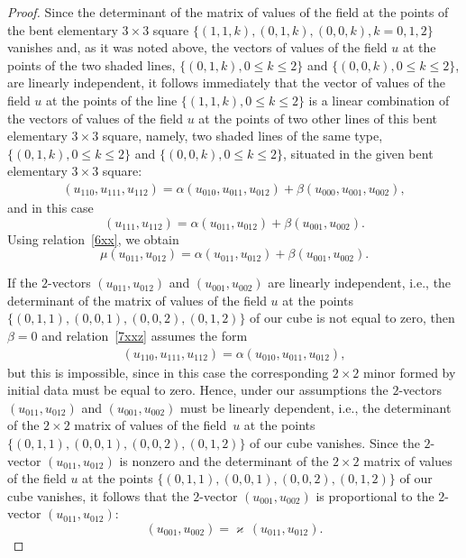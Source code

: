 \begin{proof}
Since the determinant of the matrix of values of the f\/ield at the
points of the bent elementary $3 \times 3$ square $\{(1, 1, k), (0,
1, k), (0, 0, k), k = 0, 1, 2\}$ vanishes and, as it was noted
above, the vectors of values of the f\/ield $u$ at the points of the
two shaded lines, $\{(0, 1, k), 0 \leq k \leq 2\}$ and $\{(0, 0, k),
0 \leq k \leq 2\}$, are linearly independent, it follows immediately
that the vector of values of the f\/ield $u$ at the points of the line
$\{(1, 1, k), 0 \leq k \leq 2\}$ is a linear combination of the
vectors of values of the f\/ield $u$ at the points of two other lines
of this bent elementary $3 \times 3$ square, namely, two shaded
lines of the same type, $\{(0, 1, k), 0 \leq k \leq 2\}$ and $\{(0,
0, k), 0 \leq k \leq 2\}$, situated in the given bent elementary $3
\times 3$ square:
\begin{gather} (u_{1 1 0}, u_{1 1 1}, u_{1 1 2}) = \alpha (u_{0 1 0}, u_{0 1
1}, u_{0 1 2}) + \beta (u_{0 0 0}, u_{0 0 1}, u_{0 0 2}),
\label{7xxz}
\end{gather} and in this case \[ (u_{1 1 1}, u_{1 1 2}) =
\alpha (u_{0 1 1}, u_{0 1 2}) + \beta (u_{0 0 1}, u_{0 0 2}). \]
Using relation~\eqref{6xx}, we obtain \[ \mu (u_{0 1 1}, u_{0 1 2})
= \alpha (u_{0 1 1}, u_{0 1 2}) + \beta (u_{0 0 1}, u_{0 0 2}). \]


If the $2$-vectors $(u_{0 1 1}, u_{0 1 2})$ and $(u_{0 0 1}, u_{0 0
2})$ are linearly independent, i.e., the determinant of the matrix
of values of the f\/ield $u$ at the points $\{(0, 1, 1), (0, 0, 1),
(0, 0, 2), (0, 1, 2)\}$ of our cube is not equal to zero, then
$\beta = 0$ and relation~\eqref{7xxz} assumes the form
\begin{gather*} (u_{1 1
0}, u_{1 1 1}, u_{1 1 2}) = \alpha (u_{0 1 0}, u_{0 1 1}, u_{0 1
2}), %
\end{gather*} but this is impossible, since in this case the
corresponding $2 \times 2$ minor formed by initial data must be
equal to zero.
Hence, under our assumptions the $2$-vectors $(u_{0 1 1}, u_{0 1
2})$ and $(u_{0 0 1}, u_{0 0 2})$ must be linearly dependent, i.e.,
the determinant of the $2 \times 2$ matrix of values of the f\/ield~$u$ at the points $\{(0, 1, 1), (0, 0, 1), (0, 0, 2), (0, 1, 2)\}$
of our cube vanishes. Since the $2$-vector $(u_{0 1 1}, u_{0 1 2})$
is nonzero and the determinant of the $2 \times 2$ matrix of values
of the f\/ield $u$ at the points $\{(0, 1, 1), (0, 0, 1), (0, 0, 2),
(0, 1, 2)\}$ of our cube vanishes, it follows that the $2$-vector
$(u_{0 0 1}, u_{0 0 2})$ is proportional to the $2$-vector $(u_{0 1
1}, u_{0 1 2})$: \[ (u_{0 0 1}, u_{0 0 2}) = \varkappa \, (u_{0 1
1}, u_{0 1 2}). \]



\end{proof}
